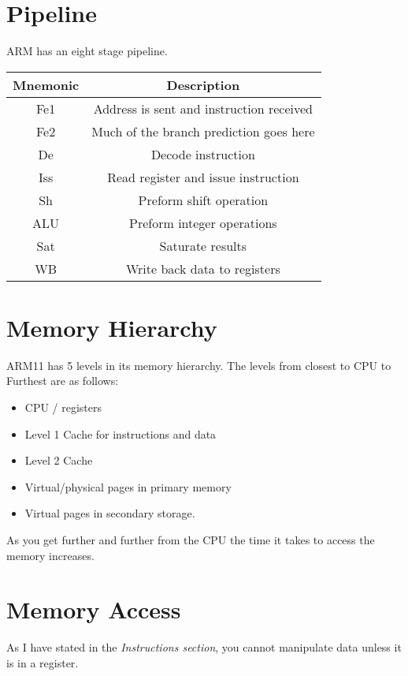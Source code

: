 \documentclass[twoside]{article}
\begin{document}
	\section{Pipeline}
	
	ARM has an eight stage pipeline.
	
	\begin{center}
		\begin{tabular}{ c c }
			
			Mnemonic  & Description \\
			\hline
			Fe1       & Address is sent and instruction received \\
			Fe2       & Much of the branch prediction goes here    \\
			De        & Decode instruction  \\
			Iss       & Read register and issue instruction \\
			Sh        & Preform shift operation \\
			ALU       & Preform integer operations \\
			Sat       & Saturate results \\
			WB        & Write back data to registers \\
		\end{tabular}
	\end{center}
	
	\section{Memory Hierarchy}
	
	ARM11 has 5 levels in its memory hierarchy.  
	The levels from closest to CPU to Furthest are as follows:  
	\begin{itemize}
		\item CPU / registers 
		\item Level 1 Cache for instructions and data 
		\item Level 2 Cache 
		\item Virtual/physical pages in primary memory 
		\item Virtual pages in secondary storage.  
	\end{itemize} 
	
	\noindent
	As you get further and further from the CPU the time it takes to access the memory increases.
	
	\section{Memory Access}
	As I have stated in the \textit{Instructions section}, you cannot manipulate data unless it is in a register.
	
\end{document}
